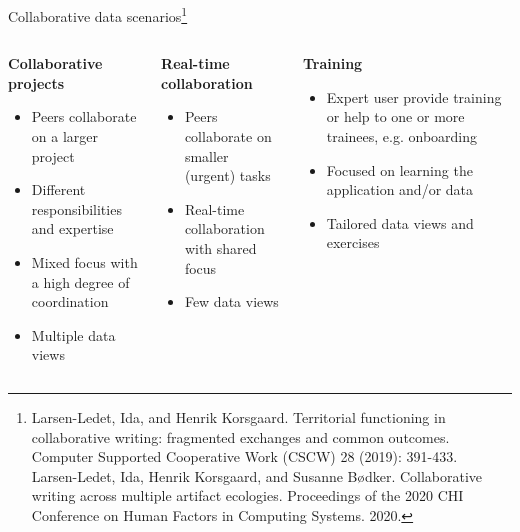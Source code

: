 \documentclass[aspectratio=169]{beamer}
\begin{document}
\begin{frame}{Collaborative data scenarios\footnote{Larsen-Ledet, Ida, and Henrik Korsgaard. Territorial functioning in collaborative writing: fragmented exchanges and common outcomes. Computer Supported Cooperative Work (CSCW) 28 (2019): 391-433.\\Larsen-Ledet, Ida, Henrik Korsgaard, and Susanne Bødker. Collaborative writing across multiple artifact ecologies. Proceedings of the 2020 CHI Conference on Human Factors in Computing Systems. 2020.}}
    \setlength{\leftmargini}{0.5cm}
    \begin{columns}[t]
        \begin{column}{0.3\textwidth}
            \textbf{Collaborative projects}
            \begin{itemize}
                \scriptsize
                \item Peers collaborate on a larger project
                \item Different responsibilities and expertise
                \item Mixed focus with a high degree of coordination
                \item Multiple data views
            \end{itemize}
        \end{column}
        \begin{column}{0.33\textwidth}
            \textbf{Real-time collaboration}
            \begin{itemize}
                \scriptsize
                \item Peers collaborate on smaller (urgent) tasks
                \item Real-time collaboration with shared focus
                \item Few data views
            \end{itemize}
        \end{column}
        \begin{column}{0.33\textwidth}
            \textbf{Training}
            \begin{itemize}
                \scriptsize
                \item Expert user provide training or help to one or more trainees, e.g. onboarding
                \item Focused on learning the application and/or data
                \item Tailored data views and exercises
            \end{itemize}
        \end{column}
    \end{columns}
\end{frame}
\end{document}
